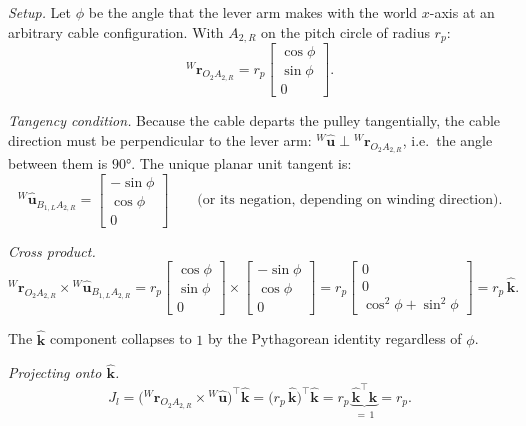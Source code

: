 \documentclass[12pt, a4paper]{article}
\theoremstyle{definition}
\begin{document}
\medskip\noindent
\textit{Setup.}
Let $\phi$ be the angle that the lever arm makes with the world $x$-axis at an
arbitrary cable configuration.  With $A_{2,R}$ on the pitch circle of radius $r_p$:
\begin{equation*}
  {}^{W}\mathbf{r}_{O_2 A_{2,R}}
  = r_p
    \begin{bmatrix} \cos\phi \\ \sin\phi \\ 0 \end{bmatrix}.
\end{equation*}

\textit{Tangency condition.}
Because the cable departs the pulley tangentially, the cable direction must be
perpendicular to the lever arm:
${}^{W}\hat{\mathbf{u}} \perp {}^{W}\mathbf{r}_{O_2 A_{2,R}}$, i.e.\ the angle
between them is $90°$.  The unique planar unit tangent is:
\begin{equation*}
  {}^{W}\hat{\mathbf{u}}_{B_{1,L}A_{2,R}}
  = \begin{bmatrix} -\sin\phi \\ \cos\phi \\ 0 \end{bmatrix}
  \qquad\text{(or its negation, depending on winding direction)}.
\end{equation*}

\textit{Cross product.}
\begin{equation}
  \label{eq:cross_belt}
  {}^{W}\mathbf{r}_{O_2 A_{2,R}} \times {}^{W}\hat{\mathbf{u}}_{B_{1,L}A_{2,R}}
  =
  r_p
  \begin{bmatrix} \cos\phi \\ \sin\phi \\ 0 \end{bmatrix}
  \times
  \begin{bmatrix} -\sin\phi \\ \cos\phi \\ 0 \end{bmatrix}
  =
  r_p
  \begin{bmatrix} 0 \\ 0 \\ \cos^2\!\phi + \sin^2\!\phi \end{bmatrix}
  =
  r_p\,\hat{\mathbf{k}}.
\end{equation}

The $\hat{\mathbf{k}}$ component collapses to $1$ by the Pythagorean identity regardless
of $\phi$.

\textit{Projecting onto $\hat{\mathbf{k}}$.}
\begin{equation}
  \label{eq:belt_derivation}
  J_l
  = \bigl({}^{W}\mathbf{r}_{O_2 A_{2,R}} \times {}^{W}\hat{\mathbf{u}}\bigr)^\top\hat{\mathbf{k}}
  = \bigl(r_p\,\hat{\mathbf{k}}\bigr)^\top\hat{\mathbf{k}}
  = r_p\,\underbrace{\hat{\mathbf{k}}^\top\hat{\mathbf{k}}}_{=\,1}
  = r_p .
\end{equation}
\end{document}
